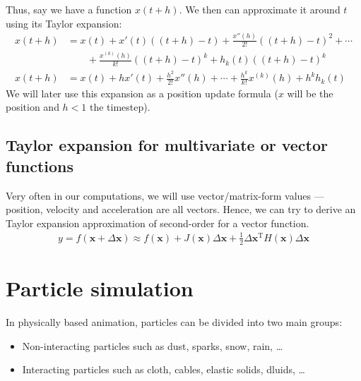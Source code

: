 \documentclass{article}
\begin{document}
Thus, say we have a function $x(t+h)$. We then can approximate it around $t$ using its Taylor expansion:
\begin{align*}
    x(t+h) &= x(t) + x'(t)((t+h)-t) + \frac{x''(h)}{2!}((t+h)-t)^2 + \cdots \\ &\qquad {} +\frac{x^{(k)}(h)}{k!}((t+h)-t)^k + h_k(t)((t+h)-t)^k \\
    x(t+h) &= x(t) + h x'(t) + \frac{h^2}{2!}x''(h)+ \cdots + \frac{h^k}{k!}x^{(k)}(h) +  h^k h_k(t) 
\end{align*}
We will later use this expansion as a position update formula ($x$ will be the position and $h<1$ the timestep).

\subsection{Taylor expansion for multivariate or vector functions} 
Very often in our computations, we will use vector/matrix-form values --- position, velocity and acceleration are all vectors.
Hence, we can try to derive an Taylor expansion approximation of second-order for a vector function.
\begin{align}
    y=f(\mathbf{x}+\Delta\mathbf{x})\approx f(\mathbf{x}) + J(\mathbf{x})\Delta \mathbf{x} +\frac{1}{2} \Delta\mathbf{x}^\mathrm{T} H(\mathbf{x}) \Delta\mathbf{x}
\end{align}
\section{Particle simulation}
In physically based animation, particles can be divided into two main groups:
\begin{itemize}
\item Non-interacting particles such as dust, sparks, snow, rain, \ldots 
\item Interacting particles such as cloth, cables, elastic solids, dluids, \ldots 
\end{itemize}
\end{document}
